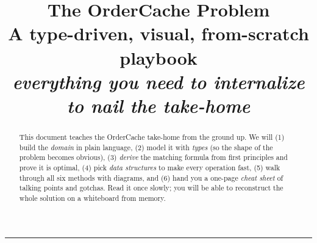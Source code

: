 \documentclass[11pt]{article}
\title{\vspace{-1.2cm}\Huge\bfseries The \textsf{OrderCache} Problem\\[4pt]
  \large\mdseries A type-driven, visual, from-scratch playbook\\
  \normalsize\itshape everything you need to internalize to nail the take-home}
\author{}
\date{}
\begin{document}
\maketitle
\vspace{-1.4cm}
\begin{center}\rule{0.9\linewidth}{0.6pt}\end{center}

\begin{abstract}\noindent
This document teaches the \textsf{OrderCache} take-home from the ground up. We will
(1) build the \emph{domain} in plain language, (2) model it with \emph{types}
(so the shape of the problem becomes obvious), (3) \emph{derive} the matching
formula from first principles and prove it is optimal, (4) pick \emph{data
structures} to make every operation fast, (5) walk through all six methods with
diagrams, and (6) hand you a one-page \emph{cheat sheet} of talking points and
gotchas. Read it once slowly; you will be able to reconstruct the whole solution
on a whiteboard from memory.
\end{abstract}

\tableofcontents
\clearpage
\end{document}
